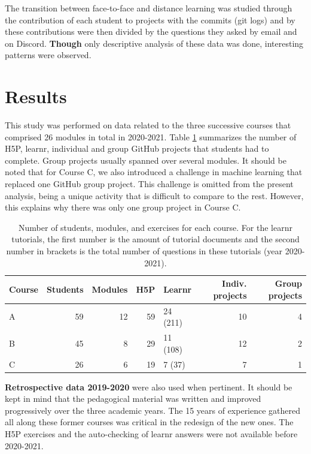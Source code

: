 \documentclass{aims}
\theoremstyle{definition}
\begin{document}
The transition between face-to-face and distance learning was studied
through the contribution of each student to projects with the commits
(git logs) and by these contributions were then divided by the questions
they asked by email and on Discord. \textbf{Though} only descriptive
analysis of these data was done, interesting patterns were observed.

\hypertarget{results}{%
\section{Results}\label{results}}

This study was performed on data related to the three successive courses
that comprised 26 modules in total in 2020-2021. Table
\ref {tab:tab_course} summarizes the number of H5P, learnr, individual
and group GitHub projects that students had to complete. Group projects
usually spanned over several modules. It should be noted that for Course
C, we also introduced a challenge in machine learning that replaced one
GitHub group project. This challenge is omitted from the present
analysis, being a unique activity that is difficult to compare to the
rest. However, this explains why there was only one group project in
Course C.

\begin{table}

\caption{\label{tab:tab_course_summary}\label{tab:tab_course} Number of students, modules, and exercises for each course. For the learnr tutorials, the first number is the amount of tutorial documents and the second number in brackets is the total number of questions in these tutorials (year 2020-2021).}
\centering
\begin{tabular}[t]{l|r|r|r|l|r|r}
\hline
Course & Students & Modules & H5P & Learnr & Indiv. projects & Group projects\\
\hline
A & 59 & 12 & 59 & 24 (211) & 10 & 4\\
\hline
B & 45 & 8 & 29 & 11 (108) & 12 & 2\\
\hline
C & 26 & 6 & 19 & 7 (37) & 7 & 1\\
\hline
\end{tabular}
\end{table}

\textbf{Retrospective data 2019-2020} \cite{Grosjeandataset2019} were
also used when pertinent. It should be kept in mind that the pedagogical
material was written and improved progressively over the three academic
years. The 15 years of experience gathered all along these former
courses was critical in the redesign of the new ones. The H5P exercises
and the auto-checking of learnr answers were not available before
2020-2021.
\end{document}

